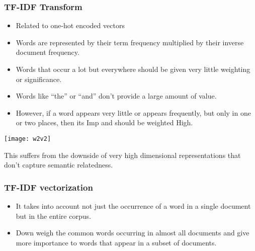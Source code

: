 

\begin{frame}[fragile]\frametitle{TF-IDF Transform}
  \begin{itemize}
    \item Related to one-hot encoded vectors
	\item Words are represented by their term frequency multiplied by their inverse document frequency.
	\item Words that occur a lot but everywhere should be given very little weighting or significance. 
	\item Words like ``the'' or ``and'' don't provide a large amount of value.
	\item  However, if a word appears very little or appears frequently, but only in one or two places, then its Imp and should be weighted High.
  \end{itemize}
  
\begin{center}
\texttt{[image: w2v2]}
\end{center}

This suffers from the downside of very high dimensional representations that don’t capture semantic relatedness.
\end{frame}

\begin{frame}[fragile]\frametitle{TF-IDF vectorization}
\begin{itemize}
\item It takes into account not just the occurrence of a word in a single document but in the entire corpus.
\item Down weigh the common words occurring in almost all documents and give more importance to words that appear in a subset of documents.
\end{itemize}
\end{frame}

